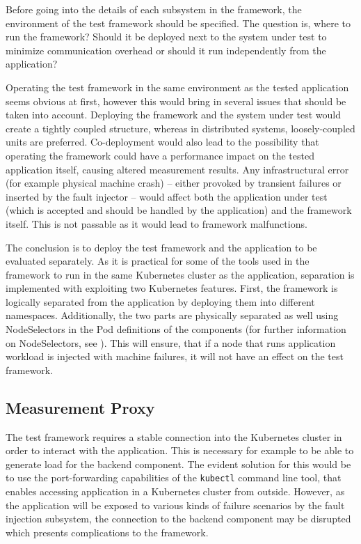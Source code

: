 Before going into the details of each subsystem in the framework, the environment of the test framework should be specified. The question is, where to run the framework? Should it be deployed next to the system under test to minimize communication overhead or should it run independently from the application?

Operating the test framework in the same environment as the tested application seems obvious at first, however this would bring in several issues that should be taken into account. Deploying the framework and the system under test would create a tightly coupled structure, whereas in distributed systems, loosely-coupled units are preferred. Co-deployment would also lead to the possibility that operating the framework could have a performance impact on the tested application itself, causing altered measurement results. Any infrastructural error (for example physical machine crash) -- either provoked by transient failures or inserted by the fault injector -- would affect both the application under test (which is accepted and should be handled by the application) and the framework itself. This is not passable as it would lead to framework malfunctions.

The conclusion is to deploy the test framework and the application to be evaluated separately. As it is practical for some of the tools used in the framework to run in the same Kubernetes cluster as the application, separation is implemented with exploiting two Kubernetes features. First, the framework is logically separated from the application by deploying them into different namespaces. Additionally, the two parts are physically separated as well using NodeSelectors in the Pod definitions of the components (for further information on NodeSelectors, see \cite{KubernetesNodeSelector}). This will ensure, that if a node that runs application workload is injected with machine failures, it will not have an effect on the test framework.

\subsection{Measurement Proxy}

The test framework requires a stable connection into the Kubernetes cluster in order to interact with the application. This is necessary for example to be able to generate load for the backend component. The evident solution for this would be to use the port-forwarding capabilities of the \texttt{kubectl} command line tool, that enables accessing application in a Kubernetes cluster from outside. However, as the application will be exposed to various kinds of failure scenarios by the fault injection subsystem, the connection to the backend component may be disrupted which presents complications to the framework.

